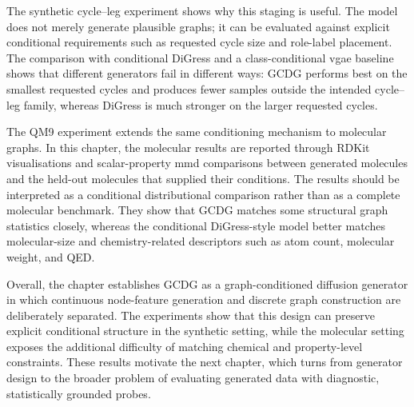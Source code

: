 The synthetic cycle--leg experiment shows why this staging is useful. The model
does not merely generate plausible graphs; it can be evaluated against explicit
conditional requirements such as requested cycle size and role-label placement.
The comparison with conditional DiGress and a class-conditional \gls{vgae}
baseline shows that different generators fail in different ways: GCDG performs
best on the smallest requested cycles and produces fewer samples outside the
intended cycle--leg family, whereas DiGress is much stronger on the larger
requested cycles.

The QM9 experiment extends the same conditioning mechanism to molecular graphs.
In this chapter, the molecular results are reported through RDKit
visualisations and scalar-property \gls{mmd} comparisons between generated
molecules and the held-out molecules that supplied their conditions. 
The results should be interpreted as a conditional distributional comparison
rather than as a complete molecular benchmark. They show that GCDG
matches some structural graph statistics closely, whereas the conditional
DiGress-style model better matches molecular-size and chemistry-related
descriptors such as atom count, molecular weight, and QED.

Overall, the chapter establishes GCDG as a graph-conditioned diffusion
generator in which continuous node-feature generation and discrete graph
construction are deliberately separated. The experiments show that this design
can preserve explicit conditional structure in the synthetic setting, while the
molecular setting exposes the additional difficulty of matching chemical and
property-level constraints. These results motivate the next chapter, which
turns from generator design to the broader problem of evaluating generated data
with diagnostic, statistically grounded probes.
